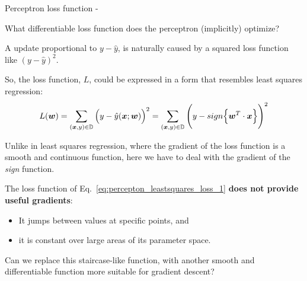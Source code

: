 \begin{frame}[t,allowframebreaks]{Perceptron loss function -}

    What differentiable \gls{loss function} does the 
    \gls{perceptron} (implicitly) optimize?\\
    \vspace{0.3cm}

    A  
    update proportional to $y-\hat{y}$, 
    is naturally caused by a squared loss function like $(y-\hat{y})^2$.\\
    \vspace{0.3cm}

    So, the \gls{loss function}, $L$,
    could be expressed in a form that resembles 
    \gls{least squares} 
    \gls{regression}:\\
    \begin{equation}
        L(\boldsymbol{w}) = 
        \sum_{(\boldsymbol{x},y) \in \mathbb{D}} 
        \Big(y - \hat{y}(\boldsymbol{x};\boldsymbol{w})\Big)^2 =
        \sum_{(\boldsymbol{x},y) \in \mathbb{D}} 
        \Bigg(y - sign\Big\{ \boldsymbol{w}^T \cdot \boldsymbol{x} \Big\}\Bigg)^2
        \label{eq:percepton_leastsquares_loss_1}  
    \end{equation}

    Unlike in \gls{least squares} 
    \gls{regression},
    where the gradient of the \gls{loss function} 
    is a smooth and continuous function, 
    here we have to deal with the gradient of the {\em sign} function. \\

    \framebreak

    \vspace{0.3cm}


    The \gls{loss function} of Eq.~\ref{eq:percepton_leastsquares_loss_1}
    {\bf does not provide useful gradients}:\\ 
    \begin{itemize}
        \item It jumps between values at specific points, and
        \item it is constant over large areas of its parameter space.\\
    \end{itemize}
    \vspace{0.3cm}

    Can we replace this staircase-like function, 
    with another smooth and differentiable function 
    more suitable for \gls{gradient descent}?\\
    \vspace{0.3cm}


\end{frame}
